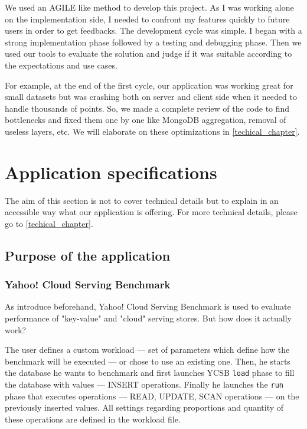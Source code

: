 \documentclass[a4paper,11pt]{report}
\begin{document}
We used an AGILE like method to develop this project. As I was working alone on the implementation side, I needed to confront my features quickly to future users in order to get feedbacks.
The development cycle was simple. I began with a strong implementation phase followed by a testing and debugging phase. Then we used our tools to evaluate the solution and judge if it was suitable according to the expectations and use cases.

For example, at the end of the first cycle, our application was working great for small datasets but was crashing both on server and client side when it needed to handle thousands of points.
So, we made a complete review of the code to find bottlenecks and fixed them one by one like MongoDB aggregation, removal of useless layers, etc. We will elaborate on these optimizations in \ref{techical_chapter}.

\section{Application specifications}

The aim of this section is not to cover technical details but to explain in an accessible way what our application is offering. For more technical details, please go to \ref{techical_chapter}.

\subsection{Purpose of the application}

\subsubsection{Yahoo! Cloud Serving Benchmark}\label{ycsb}

As introduce beforehand, Yahoo! Cloud Serving Benchmark is used to evaluate performance of "key-value" and "cloud" serving stores. But how does it actually work?

The user defines a custom workload --- set of parameters which define how the benchmark will be executed --- or chose to use an existing one. Then, he starts the database he wants to benchmark and first launches YCSB \texttt{load} phase to fill the database with values --- INSERT operations. Finally he launches the \texttt{run} phase that executes operations --- READ, UPDATE, SCAN operations --- on the previously inserted values. All settings regarding proportions and quantity of these operations are defined in the workload file.
\end{document}

